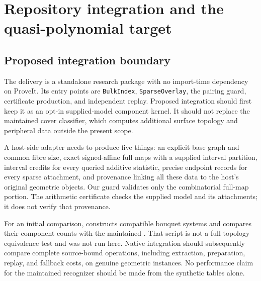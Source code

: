 \documentclass[11pt]{article}
\theoremstyle{definition}
\newcommand{\code}[1]{\texttt{#1}}
\begin{document}
\section{Repository integration and the quasi-polynomial target}
\label{sec:integration}

\subsection{Proposed integration boundary}
The delivery is a standalone research package with no import-time dependency on ProveIt. Its entry points are \code{BulkIndex}, \code{SparseOverlay}, the pairing guard, certificate production, and independent replay. Proposed integration should first keep it as an opt-in supplied-model component kernel. It should not replace the maintained cover classifier, which computes additional surface topology and peripheral data outside the present scope.

A host-side adapter needs to produce five things: an explicit base graph and common fibre size, exact signed-affine full maps with a supplied interval partition, interval credits for every queried additive statistic, precise endpoint records for every sparse attachment, and provenance linking all these data to the host's original geometric objects. Our guard validates only the combinatorial full-map portion. The arithmetic certificate checks the supplied model and its attachments; it does not verify that provenance.

For an initial comparison,  constructs compatible bouquet systems and compares their component counts with the maintained . That script is not a full topology equivalence test and was not run here. Native integration should subsequently compare complete source-bound operations, including extraction, preparation, replay, and fallback costs, on genuine geometric instances. No performance claim for the maintained recognizer should be made from the synthetic tables alone.
\end{document}
